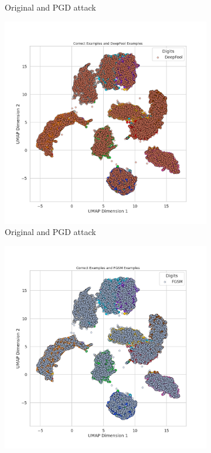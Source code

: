\documentclass[10pt, conference, a4paper, final]{IEEEtran}
\begin{document}
\begin{figure}[!ht]
\begin{subfigure}{.25\textwidth}
        \caption{Original and PGD attack}
        \label{fig:umap_pgd}
    \end{subfigure}
    \hfill
    \begin{subfigure}{.25\textwidth}
        \centering
        \includegraphics[width=\linewidth]{UMAP/UMAP_Combined_DeepFool.png}
        \caption{Original and PGD attack}
        \label{fig:umap_pgd}
    \end{subfigure}
    \hfill
    \begin{subfigure}{.25\textwidth}
        \centering
        \includegraphics[width=\linewidth]{UMAP/UMAP_Combined_FGSM.png}

\end{subfigure}
\end{figure}
\end{document}
